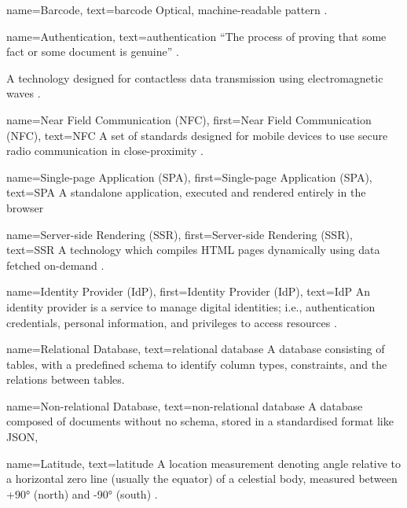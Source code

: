 {
  name={Barcode},
  text={barcode}
}
{
  Optical, machine-readable pattern
  \parencite{whatIsABarcode}.
}

{
  name={Authentication},
  text=authentication
}
{
  \enquote{The process of proving that some fact or some
    document is genuine} \parencite{whatIsAuth}.
}

{
  A technology designed for contactless data transmission
  using electromagnetic waves \parencite{whatIsRfid}.
}

{
  name={Near Field Communication (NFC)},
  first={Near Field Communication (NFC)},
  text={NFC}
}
{
  A set of standards designed for mobile devices to use
  secure radio communication in close-proximity \cite{nfc}.
}

{
  name={Single-page Application (SPA)},
  first={Single-page Application (SPA)},
  text={SPA}
}
{
  A standalone application, executed and rendered entirely
  in the browser \parencite{webTechComparison}
}

{
  name={Server-side Rendering (SSR)},
  first={Server-side Rendering (SSR)},
  text={SSR}
}
{
  A technology which compiles HTML pages dynamically using
  data fetched on-demand \parencite{webTechComparison}.
}

{
  name={Identity Provider (IdP)},
  first={Identity Provider (IdP)},
  text={IdP}
}
{
  An identity provider is a service to manage digital
  identities; i.e., authentication credentials, personal
  information, and privileges to access resources
  \parencite{identityProviders}.
}

{
  name={Relational Database},
  text={relational database}
}
{
  A database consisting of tables, with a predefined schema
  to identify column types, constraints, and the relations
  between tables.
}

{
  name={Non-relational Database},
  text={non-relational database}
}
{
  A database composed of documents without no schema,
  stored in a standardised format like JSON,
}

{
  name={Latitude},
  text={latitude}
}
{
  A location measurement denoting angle relative to a
  horizontal zero line (usually the equator) of a celestial
  body, measured between +\ang{90} (north) and -\ang{90}
  (south) \parencite{coordSystems}.
}

